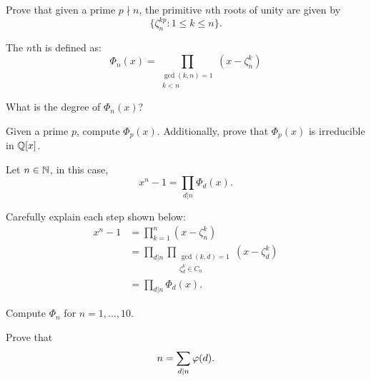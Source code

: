 \documentclass{ximera}
\begin{document}
\begin{exercise}\label{E:KP}
  Prove that given a prime $p\nmid n$, the primitive $n$th roots of
  unity are given by
  \[
  \{\zeta_n^{kp}: 1\le k \le n\}.
  \]
\end{exercise}




\begin{definition}
The $n$th  is defined as:
\[
\Phi_n(x) = \prod_{\substack{\gcd(k,n)=1 \\ k<n}}(x-\zeta_n^k)
\]
\end{definition}

\begin{exercise}
  What is the degree of $\Phi_n(x)$?
\end{exercise}

\begin{exercise}
  Given a prime $p$, compute $\Phi_p(x)$. Additionally, prove that
  $\Phi_p(x)$ is irreducible in $\mathbb Q[x]$.
\end{exercise}


\begin{theorem}
  Let $n\in \mathbb N$, in this case,
  \[
  x^n-1 = \prod_{d|n} \Phi_d(x).
  \]
  \begin{sketch}
    Carefully explain each step shown below:
    \begin{align*}
      x^n - 1 &= \prod_{k=1}^n (x-\zeta_n^k) \\
      &=\prod_{d|n}\prod_{\substack{\gcd(k,d) = 1\\ \zeta_d^k \in C_n}}(x-\zeta_d^k) \\
      &=\prod_{d|n} \Phi_d(x).
    \end{align*}
  \end{sketch}
\end{theorem}


\begin{exercise}
  Compute $\Phi_n$ for $n = 1, \dots, 10$.
\end{exercise}

\begin{exercise}
  Prove that 
  \[
  n = \sum_{d|n} \eulerphi(d).
  \]
\end{exercise}


  
\end{document}
